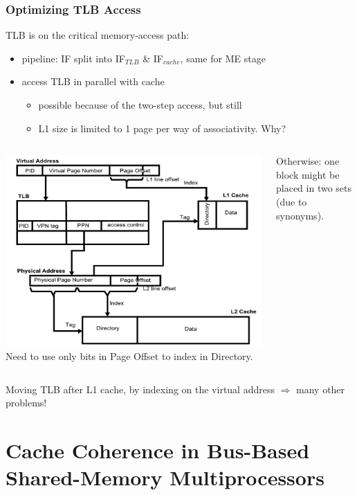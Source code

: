 \documentclass{beamer}
\renewcommand{\emph}[1]{\textcolor{structure}{#1}}
\newcommand{\emp}[1]{\textcolor{DikuRed}{ #1}}
\begin{document}
\begin{frame}[fragile,t]
\frametitle{Optimizing TLB Access}

TLB is on the critical memory-access path:
\begin{itemize}
    \item pipeline: IF split into IF$_{TLB}$ \& IF$_{cache}$, same for ME stage
    \item access TLB in parallel with cache
        \begin{itemize}
            \item \emph{possible because of the two-step access}, but still
            \item \emp{L1 size is limited to 1 page per way of associativity. Why?}
        \end {itemize}
\end  {itemize}


\begin{columns}
\includegraphics[width=40ex]{FigsMemH/TLBtransl}
Need to use only bits in Page Offset to index in Directory.\\\bigskip

Otherwise: one block might be placed in two sets (due to synonyms).
\end{columns}

{\scriptsize Moving TLB after L1 cache, by indexing on the 
 virtual address $\Rightarrow$ many other problems!}

\end{frame}

\section{Cache Coherence in Bus-Based Shared-Memory Multiprocessors}
\begin{frame}[fragile]
	\tableofcontents[currentsection]
\end{frame}
\end{document}
